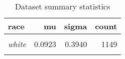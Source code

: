 \begin{table}

\caption{\label{tab:dataset_summary}Dataset summary statistics}
\centering
\begin{tabular}[t]{>{}lrrr}
\toprule
race & mu & sigma & count\\
\midrule
\em{\cellcolor{gray!6}{black}} & \cellcolor{gray!6}{0.5220} & \cellcolor{gray!6}{1.0723} & \cellcolor{gray!6}{159}\\
\em{white} & 0.0923 & 0.3940 & 1149\\
\em{\cellcolor{gray!6}{total}} & \cellcolor{gray!6}{0.1445} & \cellcolor{gray!6}{0.5432} & \cellcolor{gray!6}{1308}\\
\bottomrule
\end{tabular}
\end{table}
